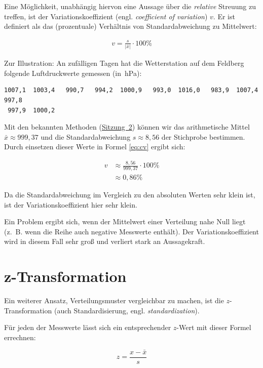 \documentclass[
  11pt,
  ngerman,
  a4paper,
]{report}
\begin{document}
Eine Möglichkeit, unabhängig hiervon eine Aussage über die \emph{relative} Streuung zu treffen, ist der Variationskoeffizient (engl. \emph{coefficient of variation}) \(v\). Er ist definiert als das (prozentuale) Verhältnis von Standardabweichung zu Mittelwert:

\[\begin{aligned}
v=\frac{s}{|\bar{x}|}\cdot 100\%
\end{aligned}
\label{eq:cv}
\]

Zur Illustration: An zufälligen Tagen hat die Wetterstation auf dem Feldberg folgende Luftdruckwerte gemessen (in~hPa):

\begin{verbatim}
1007,1  1003,4   990,7   994,2  1000,9   993,0  1016,0   983,9  1007,4   997,8  
 997,9  1000,2
\end{verbatim}

Mit den bekannten Methoden (\protect\hyperlink{mauxdfzahlen}{Sitzung~2}) können wir das arithmetische Mittel \(\bar{x}\approx 999,37\) und die Standardabweichung \(s\approx8,56\) der Stichprobe bestimmen. Durch einsetzen dieser Werte in Formel \eqref{eq:cv} ergibt sich:

\[\begin{aligned}
v&\approx\frac{8{,}56}{999{,}37}\cdot 100\%\\[4pt]
 &\approx0{,}86\%
\end{aligned}
\]

Da die Standardabweichung im Vergleich zu den absoluten Werten sehr klein ist, ist der Variationskoeffizient hier sehr klein.

Ein Problem ergibt sich, wenn der Mittelwert einer Verteilung nahe Null liegt (z.~B. wenn die Reihe auch negative Messwerte enthält). Der Variationskoeffizient wird in diesem Fall sehr groß und verliert stark an Aussagekraft.

\hypertarget{z-transformation}{%
\section{z-Transformation}\label{z-transformation}}

Ein weiterer Ansatz, Verteilungsmuster vergleichbar zu machen, ist die \(z\)-Transformation (auch Standardisierung, engl. \emph{standardization}).

Für jeden der Messwerte lässt sich ein entsprechender \(z\)-Wert mit dieser Formel errechnen:

\[
z=\frac{x-\bar{x}}{s}
\label{eq:z}
\]
\end{document}
